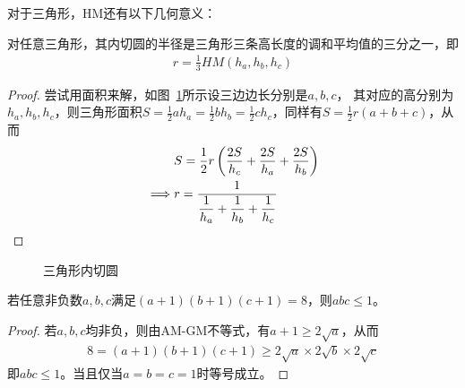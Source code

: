 对于三角形，HM还有以下几何意义：
\begin{example}
  对任意三角形，其内切圆的半径是三角形三条高长度的调和平均值的三分之一，即
  \begin{align*}
    r=\frac13 HM(h_a,h_b,h_c)
  \end{align*}
\end{example}
\begin{proof}
  尝试用面积来解，如图~\ref{fig:incircle}所示设三边边长分别是$a,b,c$，
  其对应的高分别为 $h_a, h_b, h_c$，则三角形面积$S=\frac12
  ah_a = \frac12 bh_b = \frac12 ch_c$，同样有$S=\frac12 r(a+b+c)$，从而
  \begin{align*}
    & S = \frac12 r\left( \frac{2S}{h_c} +\frac{2S}{h_a} + \frac{2S}{h_b} \right)\\
    \implies & r=\frac{1}{\dfrac1{h_a} + \dfrac1{h_b} + \dfrac1{h_c}} \qedhere
  \end{align*}
\end{proof}

\begin{figure}[htbp]
  \centering
  \caption{三角形内切圆}
  \label{fig:incircle}
\end{figure}

\begin{example}
  若任意非负数$a,b,c$满足$(a+1)(b+1)(c+1)=8$，则$abc\le 1$。
\end{example}
\begin{proof}
  若$a,b,c$均非负，则由AM-GM不等式，有$a+1\ge 2\sqrt{a}$，从而
  \begin{align*}
    8=(a+1)(b+1)(c+1)\ge 2\sqrt{a}\times 2\sqrt{b} \times 2\sqrt{c}
  \end{align*}
  即$abc\le1$。当且仅当$a=b=c=1$时等号成立。
\end{proof}

